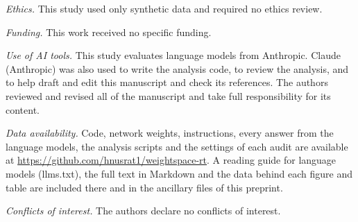 \documentclass[aps,prx,reprint,superscriptaddress,nofootinbib]{revtex4-2}
\newenvironment{statements}{\par\addvspace{10pt}}{\par}
\begin{document}
\begin{statements}
\textit{Ethics.} This study used only synthetic data and required no ethics review.

\textit{Funding.} This work received no specific funding.

\textit{Use of AI tools.} This study evaluates language models from Anthropic. Claude (Anthropic) was also used to write the
analysis code, to review the analysis, and to help draft and edit this manuscript and check its
references. The authors reviewed and revised all of the manuscript and take full responsibility for
its content.

\textit{Data availability.} Code, network weights, instructions, every answer from the language models, the analysis scripts and
the settings of each audit are available at \url{https://github.com/hnusrat1/weightspace-rt}. A
reading guide for language models (llms.txt), the full text in Markdown and the data behind each
figure and table are included there and in the ancillary files of this preprint.

\textit{Conflicts of interest.} The authors declare no conflicts of interest.
\end{statements}
\end{document}

